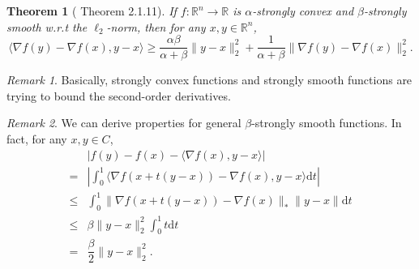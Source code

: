 \documentclass[openany]{book}
\newtheorem{theorem}{Theorem}[chapter]
\theoremstyle{definition}
\theoremstyle{remark}
\newtheorem*{remark}{Remark}
\begin{document}
\begin{theorem}[\cite{N13} Theorem 2.1.11]\label{strConvSmootht}
    If $f:\mathbb{R}^n\to \mathbb{R}$ is $\alpha$-strongly convex and $\beta$-strongly smooth w.r.t the $\ell_2$-norm, then for any $x,y\in \mathbb{R}^n$,
    \begin{equation}\label{strConvSmooth}
        \langle\nabla f(y)-\nabla f(x),y-x\rangle\ge\frac{\alpha\beta}{\alpha+\beta}\|y-x\|_2^2+\frac{1}{\alpha+\beta}\|\nabla f(y)-\nabla f(x)\|_2^2.
    \end{equation}
\end{theorem}
\begin{remark}
    Basically, strongly convex functions and strongly smooth functions are trying to bound the second-order derivatives.
\end{remark}
\begin{remark}
    We can derive properties for general $\beta$-strongly smooth functions. In fact, for any $x,y\in C$,
    \begin{equation}
        \begin{array}{cl}
             & |f(y)-f(x)-\langle\nabla f(x),y-x\rangle| \\
            = & \left|\displaystyle\int_0^1 \langle\nabla f(x+t(y-x))-\nabla f(x),y-x\rangle \mathrm{d}t\right| \\
            \le & \displaystyle\int_0^1\|\nabla f(x+t(y-x))-\nabla f(x)\|_*\|y-x\|\mathrm{d}t \\
            \le & \beta\|y-x\|_2^2\displaystyle\int_0^1t \mathrm{d}t \\
            = & \dfrac{\beta}{2}\|y-x\|_2^2.
        \end{array}
    \end{equation}
\end{remark}
\end{document}
